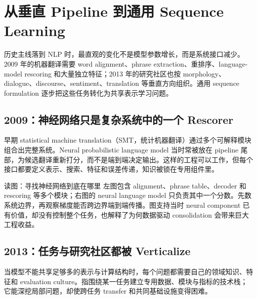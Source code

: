 \section{从垂直 Pipeline 到通用 Sequence Learning}

历史主线落到 NLP 时，最直观的变化不是模型参数增长，而是系统接口减少。2009 年的机器翻译需要 word alignment、phrase extraction、重排序、language-model rescoring 和大量独立特征；2013 年的研究社区也按 morphology、dialogue、discourse、sentiment、translation 等垂直方向组织。通用 sequence formulation 逐步把这些任务转化为共享表示学习问题。

\subsection{2009：神经网络只是复杂系统中的一个 Rescorer}

早期 statistical machine translation（SMT，统计机器翻译）通过多个可解释模块组合出完整系统。Neural probabilistic language model 当时常被放在 pipeline 尾部，为候选翻译重新打分，而不是端到端决定输出。这样的工程可以工作，但每个接口都要定义表示、搜索、特征和误差传递，知识被锁在专用组件里。


\begin{knowledgebox}{读图：寻找神经网络到底在哪里}
左图包含 alignment、phrase table、decoder 和 rescoring 等多个模块；右图的 neural language model 只负责其中一个分数。先数系统边界，再观察梯度能否跨边界端到端传播。图支持当时 neural component 已有价值，却没有控制整个任务，也解释了为何数据驱动 consolidation 会带来巨大工程收益。
\end{knowledgebox}


\subsection{2013：任务与研究社区都被 Verticalize}

当模型不能共享足够多的表示与计算结构时，每个问题都需要自己的领域知识、特征和 evaluation culture。指围绕某一任务建立专用数据、模块与指标的技术栈；它能深挖局部问题，却使跨任务 transfer 和共同基础设施变得困难。

